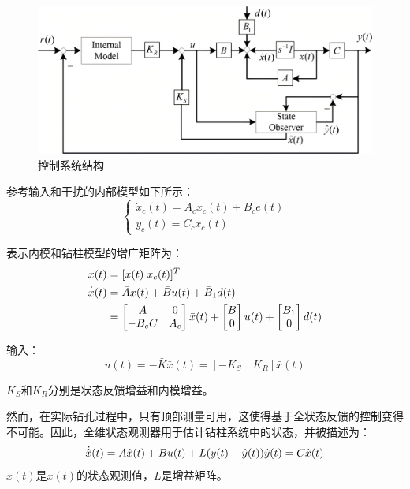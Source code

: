 \documentclass[12pt,hyperref,a4paper,UTF8]{ctexart}
\begin{document}
	\begin{figure}[!htbp]
		\centering
		\includegraphics[width=0.7\linewidth]{figures/控制系统结构}
		\caption{控制系统结构}
		\label{fig:控制系统结构}
	\end{figure}
	
	参考输入和干扰的内部模型如下所示：
	\begin{equation} 
		\begin{cases} \dot{x}_{c}(t)=A_{c}x_{c}(t)+B_{c}e(t)\\ y_{c}(t)=C_{c}x_{c}(t) \end{cases}  
	\end{equation}
	
	表示内模和钻柱模型的增广矩阵为：
	\begin{align} {\bar{x}}(t)& = {[x(t){\rm{\;}}{x_c}(t)]^T} \\ \dot{\bar{x}}(t) & =\bar{A}\bar{x}(t)+\bar{B}u(t)+\bar{B}_{1}d(t)\\ & =\begin{bmatrix} A & 0\\ -B_{c}C & A_{c} \end{bmatrix}\bar{x}(t)+\begin{bmatrix} B\\ 0 \end{bmatrix}u(t)+\begin{bmatrix} B_{1}\\ 0 \end{bmatrix}d(t)  \end{align}
	
	输入：
	\begin{equation}
		u(t)=-\bar{K}\bar{x}(t)=[-K_{S}\quad K_{R}]\bar{x}(t)
	\end{equation}
	
	$K_S$和$K_R$分别是状态反馈增益和内模增益。
	
	
	
	然而，在实际钻孔过程中，只有顶部测量可用，这使得基于全状态反馈的控制变得不可能。因此，全维状态观测器用于估计钻柱系统中的状态，并被描述为：
	\begin{equation}
		\dot{\hat{x}}(t)=A\hat{x}(t)+Bu(t)+L(y(t)-\hat{y}(t))\\ \hat{y}(t)=C\hat{x}(t)
	\end{equation}
	${\hat{x}}(t)$是${x}(t)$的状态观测值，$L$是增益矩阵。
	
\end{document}

